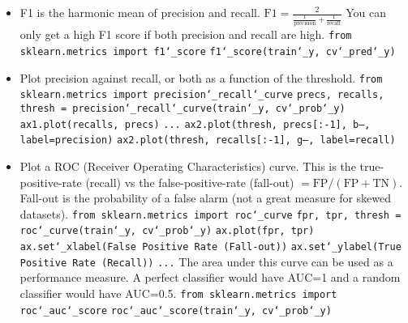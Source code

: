 \begin{itemize}
\item
F1 is the harmonic mean of precision and recall.
$\textrm{F1} = \frac{2}{\frac{1}{\textrm{precision}} + \frac{1}{\textrm{recall}}}$\newline
You can only get a high F1 score if both precision and recall are high.\newline
\texttt{from sklearn.metrics import f1\char`_score}\newline
\texttt{f1\char`_score(train\char`_y, cv\char`_pred\char`_y)}\newline

\item
Plot precision against recall, or both as a function of the threshold.\newline
\texttt{from sklearn.metrics import precision\char`_recall\char`_curve}\newline
\texttt{precs, recalls, thresh = precision\char`_recall\char`_curve(train\char`_y, cv\char`_prob\char`_y)}\newline
\texttt{ax1.plot(recalls, precs)}\newline
\texttt{...}\newline
\texttt{ax2.plot(thresh, precs[:-1], \textquotesingle b--\textquotesingle, label=\textquotesingle precision\textquotesingle)}\newline
\texttt{ax2.plot(thresh, recalls[:-1], \textquotesingle g--\textquotesingle, label=\textquotesingle recall\textquotesingle)}\newline

\item
Plot a ROC (Receiver Operating Characteristics) curve.\newline
This is the true-positive-rate (recall)
vs the false-positive-rate (fall-out)
$= \textrm{FP} / (\textrm{FP}+\textrm{TN})$.\newline
Fall-out is the probability of a false alarm (not a great measure for skewed datasets).\newline
\texttt{from sklearn.metrics import roc\char`_curve}\newline
\texttt{fpr, tpr, thresh = roc\char`_curve(train\char`_y, cv\char`_prob\char`_y)}\newline
\texttt{ax.plot(fpr, tpr)}\newline
\texttt{ax.set\char`_xlabel(\textquotesingle False Positive Rate (Fall-out)\textquotesingle)}\newline
\texttt{ax.set\char`_ylabel(\textquotesingle True Positive Rate (Recall)\textquotesingle)}\newline
\texttt{...}\newline
The area under this curve can be used as a performance measure.\newline
A perfect classifier would have AUC=1 and a random classifier would have AUC=0.5.
\texttt{from sklearn.metrics import roc\char`_auc\char`_score}\newline
\texttt{roc\char`_auc\char`_score(train\char`_y, cv\char`_prob\char`_y)}


\end{itemize}
